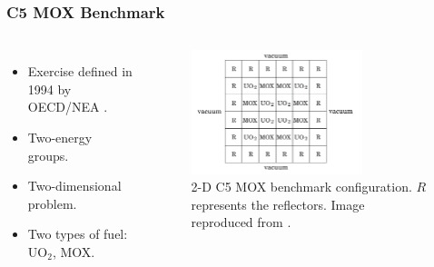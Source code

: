 \begin{frame}
\frametitle{C5 MOX Benchmark}

\begin{columns}
    \column[t]{5cm}
    \begin{itemize}
        \item Exercise defined in 1994 by OECD/NEA \cite{cavarec_benchmark_1994}.
        \item Two-energy groups.
        \item Two-dimensional problem.
        \item Two types of fuel: UO$_2$, MOX.
    \end{itemize}

    \column[t]{5cm}
    \begin{figure}[htbp!]
        \begin{center}
            \includegraphics[width=5cm]{figures/bench-config}
        \end{center}
        \caption{2-D C5 MOX benchmark configuration. $R$ represents the reflectors. Image reproduced from \cite{capilla_applications_2009}.}
    \end{figure}
\end{columns}
\end{frame}


